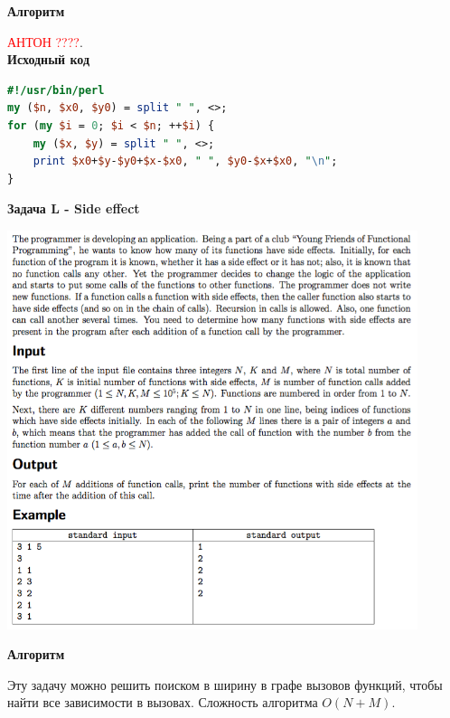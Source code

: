 \documentclass[a4paper,12pt]{article}
\begin{document}
\textbf{{\large Алгоритм}}

\textcolor{red}{\Huge{АНТОН ????}}. \\

\textbf{{\large Исходный код}} \\
\begin{lstlisting}[language=Perl]
#!/usr/bin/perl
my ($n, $x0, $y0) = split " ", <>;
for (my $i = 0; $i < $n; ++$i) {
	my ($x, $y) = split " ", <>;
	print $x0+$y-$y0+$x-$x0, " ", $y0-$x+$x0, "\n";
}
\end{lstlisting}


\newpage
\textbf{{\large Задача L - Side effect}}

\begin{center}
\includegraphics[width=0.9\textwidth]{OC_Siberia/L.png}\\ [1cm]
\end{center}

\textbf{{\large Алгоритм}}

Эту задачу можно решить поиском в ширину в графе вызовов функций, чтобы найти все зависимости в вызовах. Сложность алгоритма $O(N + M)$. \\
\end{document}
